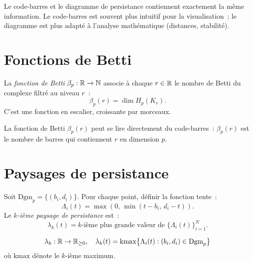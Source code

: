 \begin{remarque}
Le code-barres et le diagramme de persistance contiennent exactement la
m\^eme information. Le code-barres est souvent plus intuitif pour la
visualisation~; le diagramme est plus adapt\'e \`a l'analyse
math\'ematique (distances, stabilit\'e).
\end{remarque}

\section{Fonctions de Betti}

\begin{definition}
La \emph{fonction de Betti} $\beta_p : \mathbb{R} \to \mathbb{N}$ associe \`a chaque
$r \in \mathbb{R}$ le nombre de Betti du complexe filtr\'e au niveau $r$~:
\[
  \beta_p(r) = \dim H_p(K_r).
\]
C'est une fonction en escalier, croissante par morceaux.
\end{definition}

\begin{proposition}
La fonction de Betti $\beta_p(r)$ peut se lire directement du
code-barres~: $\beta_p(r)$ est le nombre de barres qui contiennent $r$
en dimension $p$.
\end{proposition}

\section{Paysages de persistance}

\begin{definition}
Soit $\mathrm{Dgm}_p = \{(b_i, d_i)\}$. Pour chaque point, d\'efinir
la fonction tente~:
\[
  \Lambda_i(t) = \max\left(0,\, \min(t - b_i,\, d_i - t)\right).
\]
Le \emph{$k$-i\`eme paysage de persistance} est~:
\[
  \lambda_k(t) = k\text{-i\`eme plus grande valeur de }
  \{\Lambda_i(t)\}_{i=1}^N.
\]
\end{definition}

\begin{formules}[title=\textbf{Paysage de persistance}]
\[
  \lambda_k : \mathbb{R} \to \mathbb{R}_{\geq 0}, \quad
  \lambda_k(t) = \mathrm{kmax}\big\{\Lambda_i(t) : (b_i, d_i)
  \in \mathrm{Dgm}_p\big\}
\]
o\`u $\mathrm{kmax}$ d\'enote le $k$-i\`eme maximum.
\end{formules}

